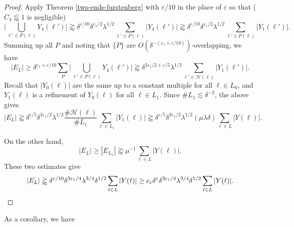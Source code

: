 \documentclass{amsart}
\numberwithin{equation}{section}
\newcommand{\de}{\delta}
\newcommand{\e}{\varepsilon}
\newcommand{\la}{\lambda}
\newcommand{\ch}{\mathcal H}
\begin{document}
\begin{proof}
Apply Theorem \ref{two-ends-furstenberg} with $\e/10$ in the place of $\e$ so that ($C_4\lessapprox1$ is negligible)
\begin{equation}
    \big|\bigcup_{\ell'\in P(\ell)}Y_4(\ell')\big|\gtrapprox \delta^{\e/10} \de^{\e_1/2}\la^{1/2}\sum_{\ell'\in P(\ell)}|Y_4(\ell')|\gtrapprox \delta^{\e/10}\de^{\e_1/2} \la^{1/2}\sum_{\ell'\in P(\ell)}|Y_1(\ell')|.
\end{equation}
Summing up all $P$ and noting that $\{P\}$ are $O(\de^{-(\e_1+\e/10)})$-overlapping, we have
\begin{equation}
    |E_L|\geq \de^{\e_1+\e/10}\sum_{P}\big|\bigcup_{\ell'\in P(\ell)}Y_4(\ell')\big|\gtrapprox \de^{3\e_1/2+\e/5}\la^{1/2}\sum_{\ell'\in \ch(\ell)}|Y_1(\ell')|. 
\end{equation}
Recall that $|Y_0(\ell)|$ are  the same up to a constant multiple for all $\ell\in L_0$, and $Y_1(\ell)$ is a refinement of $Y_0(\ell)$ for all $\ell\in L_1$.
Since $\# L_1\lesssim\de^{-2}$, the above gives
\begin{equation}
    |E_L|\gtrapprox \de^{\e/5} \de^{3\e_1/2}\la^{1/2}\frac{\#\ch(\ell)}{\# L_1}\sum_{\ell\in L_1}|Y_1(\ell)|\gtrapprox\de^{\e/5} \de^{3\e_1/2}\la^{1/2}(\mu\la\de)\sum_{\ell\in L}|Y(\ell)|.
\end{equation}

On the other hand,
\begin{equation}
    |E_L|\geq |E_{L_1}|\gtrapprox \mu^{-1}\sum_{\ell\in L}|Y(\ell)|.
\end{equation}
These two estimates give
\begin{equation}
    |E_L|\gtrapprox \de^{\e/10} \de^{3\e_1/4}\la^{3/4}\de^{1/2} \sum_{\ell\in L} |Y(\ell)|\geq c_\e\de^\e \de^{3\e_1/4}\la^{3/4}\de^{1/2} \sum_{\ell\in L} |Y(\ell)|. \qedhere
\end{equation}
\end{proof}

\smallskip

As a corollary, we have
\end{document}
